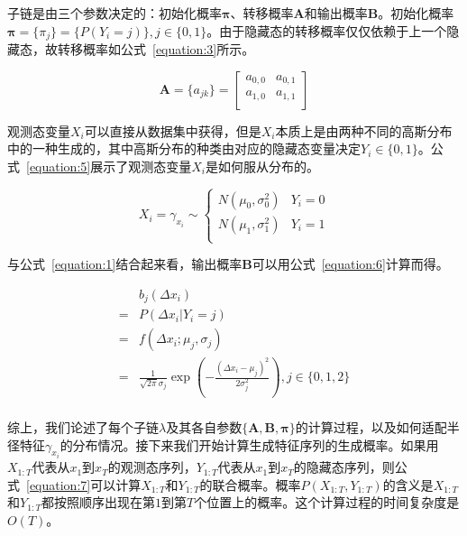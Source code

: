 子链是由三个参数决定的：初始化概率$\mathbf{\pi}$、转移概率$\mathbf{A}$和输出概率$\mathbf{B}$。初始化概率$\mathbf{\pi} = \{\pi_j\} = \{P(Y_i = j)\}, j \in \{0,1\}$。由于隐藏态的转移概率仅仅依赖于上一个隐藏态，故转移概率如公式~\eqref{equation:3}所示。

\begin{equation}
\label{equation:3}
\mathbf{A} = \{a_{jk}\} = 
\begin{bmatrix}
a_{0,0}	&	a_{0,1}	\\
a_{1,0}	&	a_{1,1}	\\
\end{bmatrix}
\end{equation}

观测态变量$X_i$可以直接从数据集中获得，但是$X_i$本质上是由两种不同的高斯分布中的一种生成的，其中高斯分布的种类由对应的隐藏态变量决定$Y_i \in \{0,1\}$。公式~\eqref{equation:5}展示了观测态变量$X_i$是如何服从分布的。

\begin{equation}
\label{equation:5}
X_i = \gamma_{x_i} \sim 
\begin{cases}
N(\mu_0, \sigma_0^2)     &     Y_i = 0	\\
N(\mu_1, \sigma_1^2)     &     Y_i = 1	\\
\end{cases} 	
\end{equation}

与公式~\eqref{equation:1}结合起来看，输出概率$\mathbf{B}$可以用公式~\eqref{equation:6}计算而得。


\begin{equation}
\label{equation:6}
\begin{aligned}	
&b_j(\Delta{x_i})\\
= &P(\Delta{x_i} | Y_i = j)\\
= &f(\Delta{x_i};\mu_j, \sigma_j) \\
= &\frac{1}{\sqrt{2\pi}\sigma_j}\exp{(-\frac{(\Delta{x_i}-\mu_j)^2}{2\sigma_j^2})}, j \in \{0,1,2\}\\
\end{aligned}
\end{equation}

综上，我们论述了每个子链$\lambda$及其各自参数$\{\mathbf{A}, \mathbf{B}, \mathbf{\pi}\}$的计算过程，以及如何适配半径特征$\gamma_{x_i}$的分布情况。接下来我们开始计算生成特征序列的生成概率。如果用$X_{1:T}$代表从$x_1$到$x_T$的观测态序列，$Y_{1:T}$代表从$x_1$到$x_T$的隐藏态序列，则公式~\eqref{equation:7}可以计算$X_{1:T}$和$Y_{1:T}$的联合概率。概率$P(X_{1:T}, Y_{1:T})$的含义是$X_{1:T}$和$Y_{1:T}$都按照顺序出现在第$1$到第$T$个位置上的概率。这个计算过程的时间复杂度是$O(T)$。


